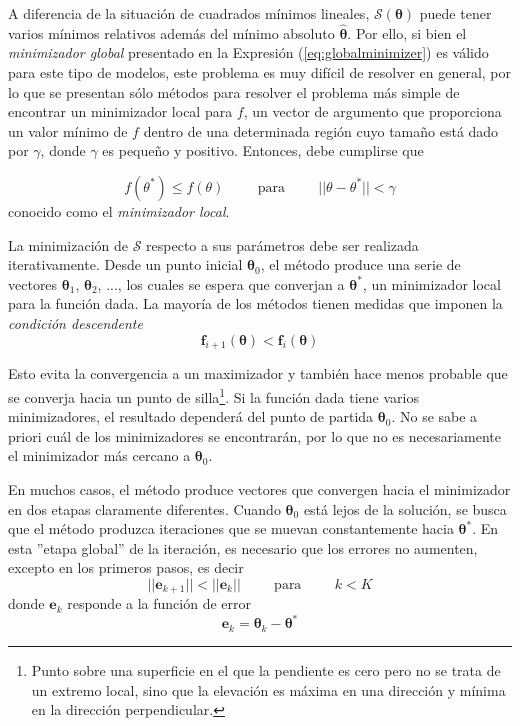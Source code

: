 A diferencia de la situación de cuadrados mínimos lineales, $\mathscr{S}(\bm{\theta})$ puede tener varios mínimos relativos además del mínimo absoluto $\hat{\bm{\theta}}$. Por ello, si bien el \textit{minimizador global} presentado en la Expresión (\ref{eq:globalminimizer}) es válido para este tipo de modelos, este problema es muy difícil de resolver en general, por lo que se presentan sólo métodos para resolver el problema más simple de encontrar un minimizador local para $f$, un vector de argumento que proporciona un valor mínimo de $f$ dentro de una determinada región cuyo tamaño está dado por $\gamma$, donde $\gamma$ es pequeño y positivo. Entonces, debe cumplirse que

\begin{equation}
    f(\theta^*) \leq f(\theta)\hspace{1cm}\text{para}\hspace{1cm}||\theta - \theta^*|| < \gamma
    \label{eq:localminimizer}
\end{equation}
conocido como el \textit{minimizador local}.

La minimización de $\mathscr{S}$ respecto a sus parámetros debe ser realizada iterativamente.
Desde un punto inicial $\bm{\theta}_0$, el método produce una serie de vectores $\bm{\theta}_1$, $\bm{\theta}_2$, ..., los cuales se espera que converjan a $\bm{\theta}^*$, un minimizador local para la función dada. La mayoría de los métodos tienen medidas que imponen la \textit{condición descendente}
\begin{equation}
    \bm{f}_{i+1}(\bm{\theta}) < \bm{f}_{i}(\bm{\theta})
    \label{eq:descendingcondition}
\end{equation}

Esto evita la convergencia a un maximizador y también hace menos probable que se converja hacia un punto de silla\footnote{Punto sobre una superficie en el que la pendiente es cero pero no se trata de un extremo local, sino que la elevación es máxima en una dirección y mínima en la dirección perpendicular.}. Si la función dada tiene varios minimizadores, el resultado dependerá del punto de partida $\bm{\theta}_0$. No se sabe a priori cuál de los minimizadores se encontrarán, por lo que no es necesariamente el minimizador más cercano a $\bm{\theta}_0$.

En muchos casos, el método produce vectores que convergen hacia el minimizador en dos etapas claramente diferentes. Cuando $\bm{\theta}_0$ está lejos de la solución, se busca que el método produzca iteraciones que se muevan constantemente hacia $\bm{\theta}^*$. En esta ''etapa global'' de la iteración, es necesario que los errores no aumenten, excepto en los primeros pasos, es decir
\begin{equation}
    ||\bm{e}_{k+1}|| < ||\bm{e}_k||\hspace{1cm}\text{para}\hspace{1cm}k<K
\end{equation}
donde $\bm{e}_k$ responde a la función de error
\begin{equation}
    \bm{e}_k = \bm{\theta}_k - \bm{\theta}^*
\end{equation}

